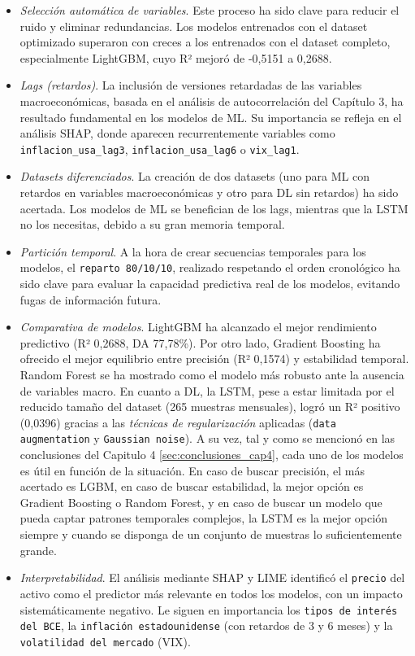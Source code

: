 \begin{itemize}
    \item \emph{Selección automática de variables}. Este proceso ha sido clave para reducir el ruido y eliminar redundancias. Los modelos entrenados con el dataset optimizado superaron con creces a los entrenados con el dataset completo, especialmente LightGBM, cuyo R² mejoró de -0,5151 a 0,2688. 
    \item \emph{Lags (retardos)}. La inclusión de versiones retardadas de las variables macroeconómicas, basada en el análisis de autocorrelación del Capítulo 3, ha resultado fundamental en los modelos de ML. Su importancia se refleja en el análisis SHAP, donde aparecen recurrentemente variables como \texttt{inflacion\_usa\_lag3}, \texttt{inflacion\_usa\_lag6} o \texttt{vix\_lag1}.
    \item \emph{Datasets diferenciados}. La creación de dos datasets (uno para ML con retardos en variables macroeconómicas y otro para DL sin retardos) ha sido acertada. Los modelos de ML se benefician de los lags, mientras que la LSTM no los necesitas, debido a su gran memoria temporal.
     \item \emph{Partición temporal}. A la hora de crear secuencias temporales para los modelos, el \texttt{reparto 80/10/10}, realizado respetando el orden cronológico ha sido clave para evaluar la capacidad predictiva real de los modelos, evitando fugas de información futura.
    \item \emph{Comparativa de modelos}. LightGBM ha alcanzado el mejor rendimiento predictivo (R² 0,2688, DA 77,78\%). Por otro lado, Gradient Boosting ha ofrecido el mejor equilibrio entre precisión (R² 0,1574) y estabilidad temporal. Random Forest se ha mostrado como el modelo más robusto ante la ausencia de variables macro. En cuanto a DL, la LSTM, pese a estar limitada por el reducido tamaño del dataset (265 muestras mensuales), logró un R² positivo (0,0396) gracias a las \emph{técnicas de regularización} aplicadas (\texttt{data augmentation} y \texttt{Gaussian noise}). A su vez, tal y como se mencionó en las conclusiones del Capitulo 4 \ref{sec:conclusiones_cap4}, cada uno de los modelos es útil en función de la situación. En caso de buscar precisión, el más acertado es LGBM, en caso de buscar estabilidad, la mejor opción es Gradient Boosting o Random Forest, y en caso de buscar un modelo que pueda captar patrones temporales complejos, la LSTM es la mejor opción siempre y cuando se disponga de un conjunto de muestras lo suficientemente grande.
    \item \emph{Interpretabilidad}. El análisis mediante SHAP y LIME identificó el \texttt{precio} del activo como el predictor más relevante en todos los modelos, con un impacto sistemáticamente negativo. Le siguen en importancia los \texttt{tipos de interés del BCE}, la \texttt{inflación estadounidense} (con retardos de 3 y 6 meses) y la \texttt{volatilidad del mercado} (VIX).

\end{itemize}
